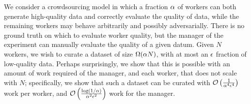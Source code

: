 We consider a crowdsourcing model in which a fraction $\alpha$ of 
workers can both generate high-quality data and correctly evaluate 
the quality of data, while the remaining workers may behave arbitrarily and 
possibly adversarially. 
There is no ground truth on which to evaluate worker quality, but the 
manager of the experiment can manually evaluate the quality of 
a given datum. Given $N$ workers, we wish to curate a dataset 
of size $\Omega(\alpha N)$, with at most an $\epsilon$ fraction of 
low-quality data.  Perhaps surprisingly, we show that this is possible with an 
amount of work required of the manager, and each worker, that does not scale 
with $N$; specifically, we show that such a dataset can be curated with
$\mathcal{O}\left( \frac{1}{\alpha^4\epsilon^4} \right)$ 
work per worker, and $\mathcal{O}\left( \frac{\log(1/\alpha)}{\alpha^2\epsilon^2} \right)$ 
work for the manager.
